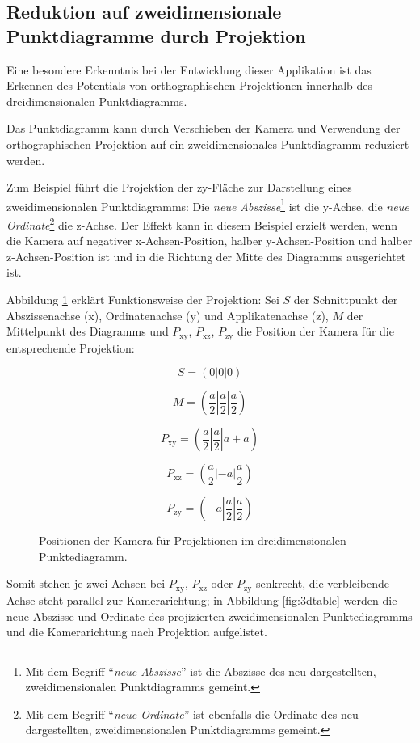 \subsection{Reduktion auf zweidimensionale Punktdiagramme durch Projektion}

Eine besondere Erkenntnis bei der Entwicklung dieser Applikation ist das Erkennen des Potentials von orthographischen Projektionen innerhalb des dreidimensionalen Punktdiagramms.

Das Punktdiagramm kann durch Verschieben der Kamera und Verwendung der orthographischen Projektion auf ein zweidimensionales Punktdiagramm reduziert werden.

Zum Beispiel führt die Projektion der zy-Fläche zur Darstellung eines zweidimensionalen Punktdiagramms: Die \textit{neue Abszisse}\footnote{Mit dem Begriff "`\textit{neue Abszisse}"' ist die Abszisse des neu dargestellten, zweidimensionalen Punktdiagramms gemeint.} ist die y-Achse, die \textit{neue Ordinate}\footnote{Mit dem Begriff "`\textit{neue Ordinate}"' ist ebenfalls die Ordinate des neu dargestellten, zweidimensionalen Punktdiagramms gemeint.} die z-Achse. Der Effekt kann in diesem Beispiel erzielt werden, wenn die Kamera auf negativer x-Achsen-Position, halber y-Achsen-Position und halber z-Achsen-Position ist und in die Richtung der Mitte des Diagramms ausgerichtet ist.

Abbildung \ref{fig:3dmath} erklärt Funktionsweise der Projektion: Sei $S$ der Schnittpunkt der Abszissenachse (x), Ordinatenachse (y) und Applikatenachse (z), $M$ der Mittelpunkt des Diagramms und $P_{\text{xy}}$, $P_{\text{xz}}$, $P_{\text{zy}}$ die Position der Kamera für die entsprechende Projektion:

\begin{figure}[H]
$$S = (0|0|0)$$

$$M = (\frac{a}{2} | \frac{a}{2} | \frac{a}{2})$$

$$P_{\text{xy}} = (\frac{a}{2} | \frac{a}{2}| a + a)$$

$$P_{\text{xz}} = (\frac{a}{2} | -a | \frac{a}{2})$$

$$P_{\text{zy}} = (-a | \frac{a}{2}| \frac{a}{2})$$

\caption{Positionen der Kamera für Projektionen im dreidimensionalen Punktediagramm.}
\label{fig:3dmath}
\end{figure}

Somit stehen je zwei Achsen bei $P_{\text{xy}}$, $P_{\text{xz}}$ oder $P_{\text{zy}}$ senkrecht, die verbleibende Achse steht parallel zur Kamerarichtung; in Abbildung \ref{fig:3dtable} werden die neue Abszisse und Ordinate des projizierten zweidimensionalen Punktediagramms und die Kamerarichtung nach Projektion aufgelistet.

